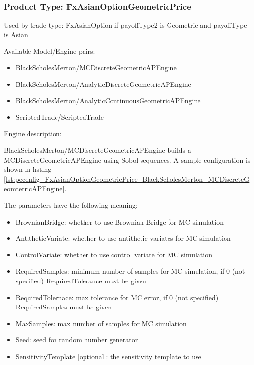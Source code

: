 \subsubsection{Product Type: FxAsianOptionGeometricPrice}

Used by trade type: FxAsianOption if payoffType2 is Geometric and payoffType is Asian

Available Model/Engine pairs:

\begin{itemize}
  \item BlackScholesMerton/MCDiscreteGeometricAPEngine
  \item BlackScholesMerton/AnalyticDiscreteGeometricAPEngine
  \item BlackScholesMerton/AnalyticContinuousGeometricAPEngine
  \item ScriptedTrade/ScriptedTrade
\end{itemize}

Engine description:

BlackScholesMerton/MCDiscreteGeometricAPEngine builds a MCDiscreteGeometricAPEngine using Sobol sequences. A sample
configuration is shown in listing
\ref{lst:peconfig_FxAsianOptionGeometricPrice_BlackScholesMerton_MCDiscreteGeomtetricAPEngine}.

The parameters have the following meaning:

\begin{itemize}
\item BrownianBridge: whether to use Brownian Bridge for MC simulation
\item AntitheticVariate: whether to use antithetic variates for MC simulation
\item ControlVariate: whether to use control variate for MC simulation
\item RequiredSamples: minimum number of samples for MC simulation, if 0 (not specified) RequiredTolerance must be given
\item RequiredTolernace: max tolerance for MC error, if 0 (not specified) RequiredSamples must be given
\item MaxSamples: max number of samples for MC simulation
\item Seed: seed for random number generator
\item SensitivityTemplate [optional]: the sensitivity template to use 
\end{itemize}

